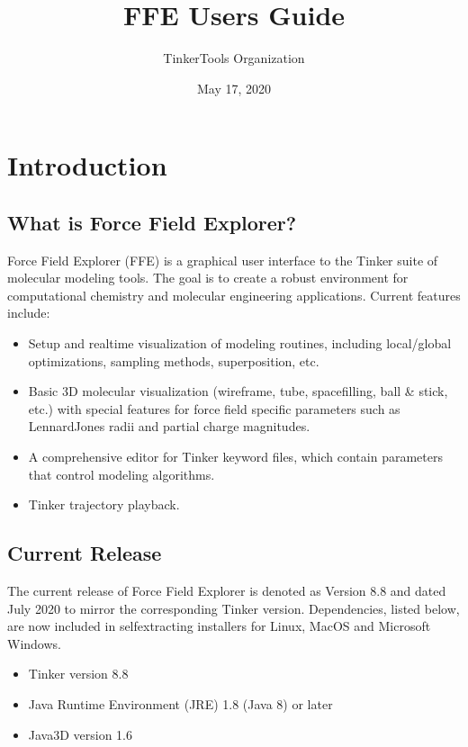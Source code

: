 \documentclass[letterpaper,11pt,english]{sphinxmanual}
\title{FFE User\textquotesingle{}s Guide}
\date{May 17, 2020}
\author{TinkerTools Organization}
\begin{document}
\pagestyle{empty}
\sphinxmaketitle
\pagestyle{plain}
\sphinxtableofcontents
\pagestyle{normal}
\label{\detokenize{index::doc}}



\chapter{Introduction}
\label{\detokenize{text/introduction:introduction}}\label{\detokenize{text/introduction::doc}}

\section{What is Force Field Explorer?}
\label{\detokenize{text/introduction:what-is-force-field-explorer}}
Force Field Explorer (FFE) is a graphical user interface to the Tinker suite of molecular modeling tools. The goal is to create a robust environment for computational chemistry and molecular engineering applications. Current features include:
\begin{itemize}
\item {} 
Setup and real\sphinxhyphen{}time visualization of modeling routines, including local/global optimizations, sampling methods, superposition, etc.

\item {} 
Basic 3D molecular visualization (wireframe, tube, spacefilling, ball \& stick, etc.) with special features for force field specific parameters such as Lennard\sphinxhyphen{}Jones radii and partial charge magnitudes.

\item {} 
A comprehensive editor for Tinker keyword files, which contain parameters that control modeling algorithms.

\item {} 
Tinker trajectory playback.

\end{itemize}


\section{Current Release}
\label{\detokenize{text/introduction:current-release}}
The current release of Force Field Explorer is denoted as Version 8.8 and dated July 2020 to mirror the corresponding Tinker version. Dependencies, listed below, are now included in self\sphinxhyphen{}extracting installers for Linux, MacOS and Microsoft Windows.
\begin{itemize}
\item {} 
Tinker version 8.8

\item {} 
Java Runtime Environment (JRE) 1.8 (Java 8) or later

\item {} 
Java3D version 1.6

\end{itemize}
\end{document}
